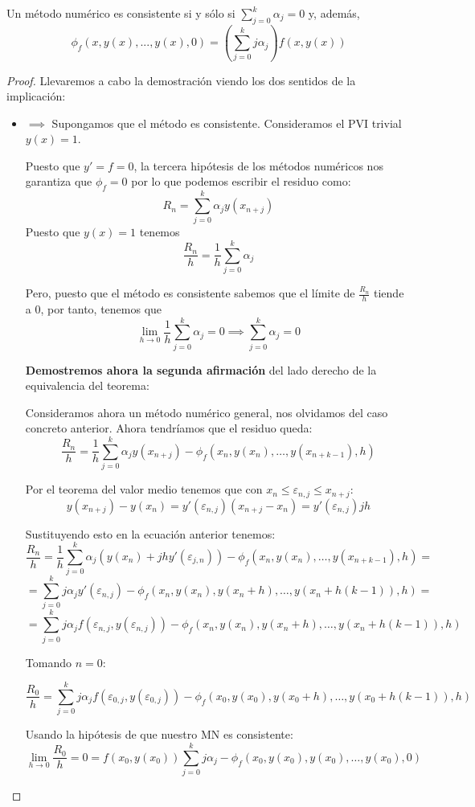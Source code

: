 \documentclass{apuntes}
\begin{document}
\begin{theorem}\label{theorem:consist_iif_relaciones}
Un método numérico es consistente si y sólo si $\sum_{j=0}^kα_j=0$ y, además,
\[\phi_f(x,y(x),...,y(x),0)=\left( \sum_{j=0}^kjα_j\right)f(x,y(x))\]
\end{theorem}
\begin{proof}
Llevaremos a cabo la demostración viendo los dos sentidos de la implicación:
\begin{itemize}
\item $\implies$
Supongamos que el método es consistente. Consideramos el PVI trivial $y(x)=1$.

Puesto que $y'=f=0$, la tercera hipótesis de los métodos numéricos nos garantiza que $\phi_f=0$ por lo que podemos escribir el residuo como:
\[R_n = \sum_{j=0}^kα_jy(x_{n+j})\]
Puesto que $y(x)=1$ tenemos
\[ \frac{R_n}{h}=\frac{1}{h}\sum_{j=0}^kα_j\]

Pero, puesto que el método es consistente sabemos que el límite de $\frac{R_n}{h}$ tiende a 0, por tanto, tenemos que 
\[\lim_{h\to 0} \frac{1}{h}\sum_{j=0}^kα_j=0 \implies \sum_{j=0}^kα_j=0\]

\textbf{Demostremos ahora la segunda afirmación} del lado derecho de la equivalencia del teorema:

Consideramos ahora un método numérico general, nos olvidamos del caso concreto anterior. Ahora tendríamos que el residuo queda:
\[\frac{R_n}{h}=\frac{1}{h}\sum_{j=0}^kα_jy(x_{n+j})-\phi_f(x_n,y(x_n),…,y(x_{n+k-1}),h)\]

Por el teorema del valor medio tenemos que con $x_n ≤ ε_{n,j} ≤ x_{n+j}$:
\[y(x_{n+j})-y(x_n)=y'(ε_{n,j})(x_{n+j}-x_n) = y'(ε_{n,j})jh\]

Sustituyendo esto en la ecuación anterior tenemos:
\[\frac{R_n}{h}=\frac{1}{h}\sum_{j=0}^kα_j(y(x_n)+jhy'(ε_{j,n}))-\phi_f(x_n,y(x_n),…,y(x_{n+k-1}),h) = \]
\[ = \sum_{j=0}^k jα_jy'(ε_{n,j}) - \phi_f\left(x_n,y(x_n), y(x_n+h) , …, y(x_n + h(k-1)), h\right) = \]
\[ = \sum_{j=0}^k jα_jf(ε_{n,j}, y(ε_{n,j})) - \phi_f\left(x_n,y(x_n), y(x_n+h) , …, y(x_n + h(k-1)), h\right)\]

Tomando \underline{$n=0$}:

\[\frac{R_0}{h} = \sum_{j=0}^k jα_jf(ε_{0,j}, y(ε_{0,j})) - \phi_f\left(x_0,y(x_0), y(x_0+h) , …, y(x_0 + h(k-1)), h\right)\]

Usando la hipótesis de que nuestro MN es consistente:
\[\lim_{h\to0} \frac{R_0}{h} = 0 = f(x_0, y(x_0)) \sum_{j=0}^k jα_j - \phi_f\left(x_0,y(x_0), y(x_0) , …, y(x_0), 0\right) \]


\end{itemize}
\end{proof}
\end{document}
